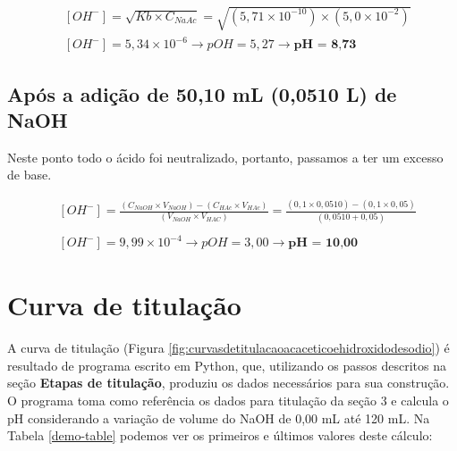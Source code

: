 \documentclass[a4paper, 12pt]{report}
\begin{document}
\begin{fleqn}
	\begin{align*}
		&[OH^{-}] = \sqrt{Kb \times C_{NaAc}} = \sqrt{(5,71 \times 10^{-10}) \times (5,0 \times 10^{-2})} \\
		&[OH^{-}] = 5,34 \times 10^{-6} \longrightarrow	 pOH = 5,27 \longrightarrow	 \textbf{pH = 8,73}
	\end{align*}
\end{fleqn}

\subsection{Após a adição de 50,10 mL (0,0510 L) de NaOH}
Neste ponto todo o ácido foi neutralizado, portanto, passamos a ter um excesso de base.

\begin{fleqn}
	\begin{align*}
		&[OH^{-}] = \frac{ (C_{NaOH} \times V_{NaOH}) - (C_{HAc} \times V_{HAc}) }{ (V_{NaOH} \times V_{HAC}) } = \frac{ (0,1 \times 0,0510) - (0,1 \times 0,05) }{ (0,0510 + 0,05) } \\ \\	
		&[OH^{-}] = 9,99 \times 10^{-4} \longrightarrow	 pOH = 3,00 \longrightarrow	 \textbf{pH = 10,00}
	\end{align*}
\end{fleqn}

\section{Curva de titulação}
A curva de titulação (Figura \ref{fig:curvasdetitulacaoacaceticoehidroxidodesodio}) é resultado de programa escrito em Python, que, utilizando os passos descritos na seção \textbf{Etapas de titulação}, produziu os dados necessários para sua construção. \\

O programa toma como referência os dados para titulação da seção 3 e calcula o pH considerando a variação de volume do NaOH de 0,00 mL até 120 mL. Na Tabela \ref{demo-table} podemos ver os primeiros e últimos valores deste cálculo:
\end{document}
